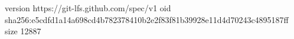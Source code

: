 version https://git-lfs.github.com/spec/v1
oid sha256:e5cdfd1a14a698cd4b782378410b2e2f83f81b39928e11d4d70243c4895187ff
size 12887
